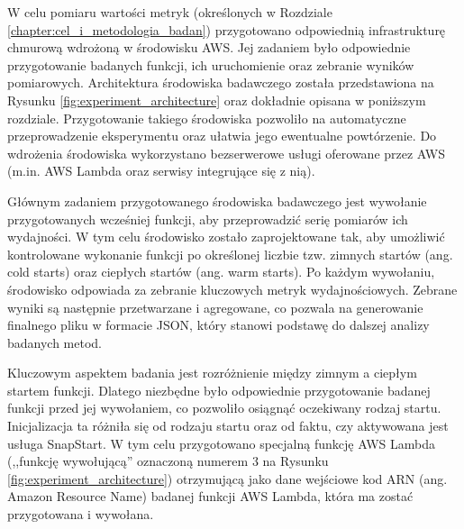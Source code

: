 W celu pomiaru wartości metryk (określonych w Rozdziale \ref{chapter:cel_i_metodologia_badan}) przygotowano odpowiednią infrastrukturę chmurową wdrożoną w środowisku AWS.
Jej zadaniem było odpowiednie przygotowanie badanych funkcji, ich uruchomienie oraz zebranie wyników pomiarowych.
Architektura środowiska badawczego została przedstawiona na Rysunku \ref{fig:experiment_architecture} oraz dokładnie opisana w poniższym rozdziale.
Przygotowanie takiego środowiska pozwoliło na automatyczne przeprowadzenie eksperymentu oraz ułatwia jego ewentualne powtórzenie.
Do wdrożenia środowiska wykorzystano bezserwerowe usługi oferowane przez AWS (m.in. AWS Lambda oraz serwisy integrujące się z nią).

Głównym zadaniem przygotowanego środowiska badawczego jest wywołanie przygotowanych wcześniej funkcji, aby przeprowadzić serię pomiarów ich wydajności.
W tym celu środowisko zostało zaprojektowane tak, aby umożliwić kontrolowane wykonanie funkcji po określonej liczbie tzw. zimnych startów (ang. cold starts) oraz ciepłych startów (ang. warm starts). 
Po każdym wywołaniu, środowisko odpowiada za zebranie kluczowych metryk wydajnościowych. 
Zebrane wyniki są następnie przetwarzane i agregowane, co pozwala na generowanie finalnego pliku w formacie JSON, który stanowi podstawę do dalszej analizy badanych metod.

Kluczowym aspektem badania jest rozróżnienie między zimnym a ciepłym startem funkcji.
Dlatego niezbędne było odpowiednie przygotowanie badanej funkcji przed jej wywołaniem, co pozwoliło osiągnąć oczekiwany rodzaj startu.
Inicjalizacja ta różniła się od rodzaju startu oraz od faktu, czy aktywowana jest usługa SnapStart.
W tym celu przygotowano specjalną funkcję AWS Lambda (,,funkcję wywołującą'' oznaczoną numerem 3 na Rysunku \ref{fig:experiment_architecture}) otrzymującą jako dane wejściowe kod ARN (ang. Amazon Resource Name) badanej funkcji AWS Lambda, która ma zostać przygotowana i wywołana.

